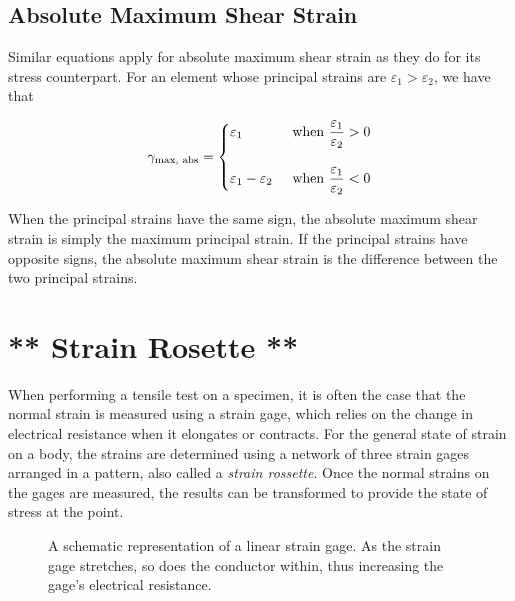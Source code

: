 \documentclass[
fontsize=10pt,
a4paper,
twosides=false,
open=any,
svgnames,
]{kaobook} %
\begin{document}
\subsection{Absolute Maximum Shear Strain}

Similar equations apply for absolute maximum shear strain as they do for its stress counterpart. For an element whose principal strains are $\varepsilon_1 > \varepsilon_2$, we have that

\begin{equation}
  \gamma_{\text{max, abs}} = \left\{
    \begin{gathered}
      \varepsilon_1 \hfill \text{when } \frac{\varepsilon_1}{\varepsilon_2} > 0 \\[10pt]
      \varepsilon_1 - \varepsilon_2 \hspace{0.5cm} \text{when } \frac{\varepsilon_1}{\varepsilon_2} < 0
    \end{gathered} \right.
\end{equation}

When the principal strains have the same sign, the absolute maximum shear strain is simply the maximum principal strain. If the principal strains have opposite signs, the absolute maximum shear strain is the difference between the two principal strains.

\section{** Strain Rosette **}

When performing a tensile test on a specimen, it is often the case that the normal strain is measured using a strain gage, which relies on the change in electrical resistance when it elongates or contracts. For the general state of strain on a body, the strains are determined using a network of three strain gages arranged in a pattern, also called a \emph{strain rossette}. Once the normal strains on the gages are measured, the results can be transformed to provide the state of stress at the point.

\begin{figure}[h]
  \centering
  \caption{A schematic representation of a linear strain gage. As the strain gage stretches, so does the conductor within, thus increasing the gage's electrical resistance.}
\end{figure}
\end{document}
